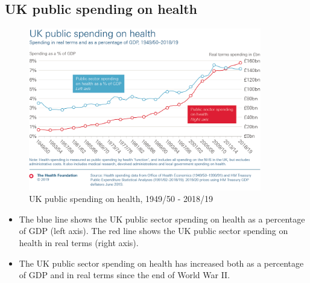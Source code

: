         \subsection{UK public spending on health}         
        \begin{figure}[H]%
                \centering
                \includegraphics[width=4in]{images/ch3/6.png}
                \caption{UK public spending on health, 1949/50 - 2018/19}
                \label{fig:label}
            \end{figure} 
\begin{itemize}           
        \item The blue line shows the UK public sector spending on health as a percentage of GDP (left axis). The red line shows the UK public sector spending on health in real terms (right axis).
        \item The UK public sector spending on health has increased both as a percentage of GDP and in real terms since the end of World War II.
        \end{itemize}

